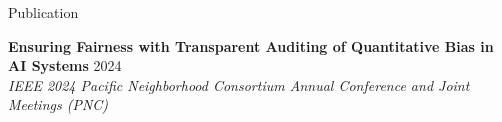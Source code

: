 \documentclass{resume} %
\begin{document}
\begin{rSection}{Publication}

{\bf Ensuring Fairness with Transparent Auditing of Quantitative Bias in AI Systems} \hfill {2024} \\
{\em IEEE 2024 Pacific Neighborhood Consortium Annual Conference and Joint Meetings (PNC)}

\end{rSection}






\end{document}
